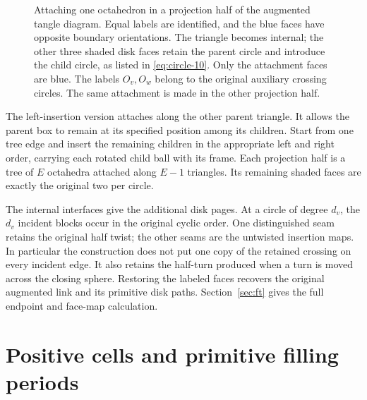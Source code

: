 \begin{figure}[ht]
\centering

\caption{Attaching one octahedron in a projection half of the augmented tangle diagram. Equal labels are identified, and the blue
faces have opposite boundary orientations. The triangle becomes
internal; the other three shaded disk faces retain the parent circle
and introduce the child circle, as listed in
\eqref{eq:circle-10}. Only the attachment faces are blue. The labels
$O_v,O_w$ belong to the original auxiliary crossing circles.
The same attachment is made in the other projection half.}
\label{fig:circle-octahedral-attachment}
\end{figure}

The left-insertion version attaches along the other parent triangle. It
allows the parent box to remain at its specified position among its
children. Start from one tree edge and insert the remaining children in
the appropriate left and right order, carrying each rotated child ball
with its frame. Each projection half is a tree of \(E\) octahedra
attached along \(E-1\) triangles. Its remaining shaded faces are exactly
the original two per circle.

The internal interfaces give the additional disk pages. At a circle of
degree \(d_v\), the \(d_v\) incident blocks occur in the original cyclic
order. One distinguished seam retains the original half twist; the other
seams are the untwisted insertion maps. In particular the construction
does not put one copy of the retained crossing on every incident edge.
It also retains the half-turn produced when a turn is moved
across the closing sphere. Restoring the labeled faces recovers the
original augmented link and its primitive disk paths. Section~\ref{sec:ft} gives the full endpoint and face-map calculation.

\section{Positive cells and primitive filling periods}\label{sec:circle-a-positive-geometric-path-rather-than-a-small-total-logarithm}

